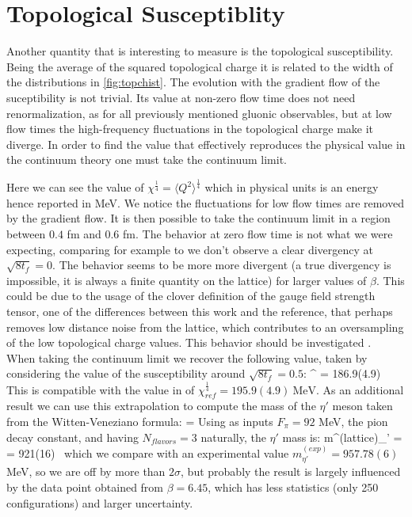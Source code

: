 \section{Topological Susceptiblity}
Another quantity that is interesting to measure is the topological susceptibility. Being the average of the squared topological charge it is related to the width of the distributions in \cref{fig:topchist}. The evolution with the gradient flow of the suceptibility is not trivial. Its value at non-zero flow time does not need renormalization, as for all previously mentioned gluonic observables, but at low flow times the high-frequency fluctuations in the topological charge make it diverge. In order to find the value that effectively reproduces the physical value in the continuum theory one must take the continuum limit. 

Here we can see the value of $\chi^{\frac{1}{4}} = \langle Q^2 \rangle ^{\frac{1}{4}}$ which in physical units is an energy hence reported in MeV. We notice the fluctuations for low flow times are removed by the gradient flow. It is then possible to take the continuum limit in a region between $0.4$ fm and $0.6$ fm. 
The behavior at zero flow time is not what we were expecting, comparing for example to \cite{shindler_nucleon_2015} we don't observe a clear divergency at $\sqrt{8t_f} = 0$. The behavior seems to be more more divergent (a true divergency is impossible, it is always a finite quantity on the lattice) for larger values of $\beta$. This could be due to the usage of the clover definition of the gauge field strength tensor, one of the differences between this work and the reference, that perhaps removes low distance noise from the lattice, which contributes to an oversampling of the low topological charge values. This behavior should be investigated .\\
When taking the continuum limit we recover the following value, taken by considering the value of the susceptibility around $\sqrt{8t_f} = 0.5$:
\beq
    \chi^{} = 186.9(4.9)~ 
    \label{val:tops}
\eeq 
This is compatible with the value in \cite{shindler_nucleon_2015} of  $\chi^{\frac{1}{4}}_{ref} = 195.9(4.9)~\text{MeV} $.
As an additional result we can use this extrapolation to compute the mass of the $\eta'$ meson taken from the Witten-Veneziano formula:
\beq
    \chi = 
\eeq 
Using as inputs $F_\pi = 92$ MeV, the pion decay constant, and having $N_{flavors} = 3$ naturally, the $\eta'$ mass is:
\beq    
    m^{(lattice)}_{\eta'} =  = 921(16)~ 
\eeq
which we compare with an experimental value  $m^{(exp)}_{\eta'} = 957.78(6)$ MeV, so we are off by more than $2\sigma$, but probably the result is largely influenced by the data point obtained from $\beta=6.45$, which has less statistics (only 250 configurations) and larger uncertainty.